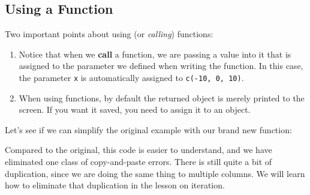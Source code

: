 \documentclass[
]{book}
\newenvironment{Shaded}{\begin{snugshade}}{\end{snugshade}}
\newcommand{\ControlFlowTok}[1]{\textcolor[rgb]{0.13,0.29,0.53}{\textbf{#1}}}
\newcommand{\DataTypeTok}[1]{\textcolor[rgb]{0.13,0.29,0.53}{#1}}
\newcommand{\DecValTok}[1]{\textcolor[rgb]{0.00,0.00,0.81}{#1}}
\newcommand{\KeywordTok}[1]{\textcolor[rgb]{0.13,0.29,0.53}{\textbf{#1}}}
\newcommand{\NormalTok}[1]{#1}
\newcommand{\OperatorTok}[1]{\textcolor[rgb]{0.81,0.36,0.00}{\textbf{#1}}}
\newcommand{\StringTok}[1]{\textcolor[rgb]{0.31,0.60,0.02}{#1}}
\begin{document}
\hypertarget{using-a-function}{%
\subsection{Using a Function}\label{using-a-function}}

Two important points about using (or \emph{calling}) functions:

\begin{enumerate}
\def\labelenumi{\arabic{enumi}.}
\item
  Notice that when we \textbf{call} a function, we are passing a value into it that is assigned to the parameter we defined when writing the function. In this case, the parameter \texttt{x} is automatically assigned to \texttt{c(-10,\ 0,\ 10)}.
\item
  When using functions, by default the returned object is merely printed to the screen. If you want it saved, you need to assign it to an object.
\end{enumerate}

Let's see if we can simplify the original example with our brand new function:

\begin{Shaded}
\end{Shaded}

Compared to the original, this code is easier to understand, and we have eliminated one class of copy-and-paste errors. There is still quite a bit of duplication, since we are doing the same thing to multiple columns. We will learn how to eliminate that duplication in the lesson on iteration.
\end{document}
